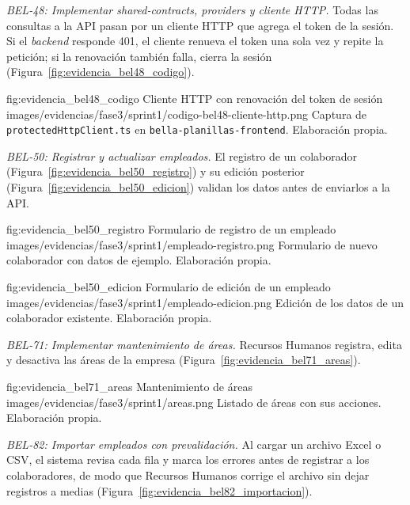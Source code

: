 \par\smallskip
\noindent\textit{BEL-48: Implementar shared-contracts, providers y cliente HTTP.}
Todas las consultas a la API pasan por un cliente HTTP que agrega el token de la sesión.
Si el \textit{backend} responde 401, el cliente renueva el token una sola vez y repite la petición;
si la renovación también falla, cierra la sesión (Figura~\ref{fig:evidencia_bel48_codigo}).

\figuraEvidenciaCompacta
    {fig:evidencia_bel48_codigo}
    {Cliente HTTP con renovación del token de sesión}
    {images/evidencias/fase3/sprint1/codigo-bel48-cliente-http.png}
    {Captura de \texttt{protectedHttpClient.ts} en \texttt{bella-planillas-frontend}. Elaboración propia.}

\par\smallskip
\noindent\textit{BEL-50: Registrar y actualizar empleados.}
El registro de un colaborador (Figura~\ref{fig:evidencia_bel50_registro}) y su edición posterior
(Figura~\ref{fig:evidencia_bel50_edicion}) validan los datos antes de enviarlos a la API.

\figuraEvidenciaCompacta
    {fig:evidencia_bel50_registro}
    {Formulario de registro de un empleado}
    {images/evidencias/fase3/sprint1/empleado-registro.png}
    {Formulario de nuevo colaborador con datos de ejemplo. Elaboración propia.}

\figuraEvidenciaCompacta
    {fig:evidencia_bel50_edicion}
    {Formulario de edición de un empleado}
    {images/evidencias/fase3/sprint1/empleado-edicion.png}
    {Edición de los datos de un colaborador existente. Elaboración propia.}

\par\smallskip
\noindent\textit{BEL-71: Implementar mantenimiento de áreas.}
Recursos Humanos registra, edita y desactiva las áreas de la empresa (Figura~\ref{fig:evidencia_bel71_areas}).

\figuraEvidenciaCompacta
    {fig:evidencia_bel71_areas}
    {Mantenimiento de áreas}
    {images/evidencias/fase3/sprint1/areas.png}
    {Listado de áreas con sus acciones. Elaboración propia.}

\clearpage
\par\smallskip
\noindent\textit{BEL-82: Importar empleados con prevalidación.}
Al cargar un archivo Excel o CSV, el sistema revisa cada fila y marca los errores antes de registrar a los colaboradores,
de modo que Recursos Humanos corrige el archivo sin dejar registros a medias (Figura~\ref{fig:evidencia_bel82_importacion}).

